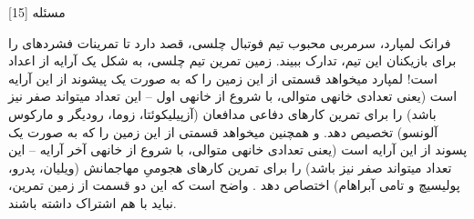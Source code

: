 ‌مسئله [15]


% 
%
%
% 
فرانک لمپارد، سرمربی محبوب تیم فوتبال چلسی، قصد دارد تا تمرینات فشردهای را برای بازیکنان این تیم، تدارک ببیند.
زمین تمرین تیم چلسی، به شکل یک آرایه از اعداد است! لمپارد میخواهد قسمتی از این زمین را که به صورت یک پیشوند از
این آرایه است (یعنی تعدادی خانهی متوالی، با شروع از خانهی اول – این تعداد میتواند صفر نیز باشد) را برای تمرین
کارهای دفاعی مدافعان (آزپیلیکوئتا، زوما، رودیگر و مارکوس آلونسو) تخصیص دهد. و همچنین میخواهد قسمتی از این
زمین را که به صورت یک پسوند از این آرایه است (یعنی تعدادی خانهی متوالی، با شروع از خانهی آخر آرایه – این تعداد میتواند صفر نیز باشد) را برای تمرین کارهای هجومیِ مهاجمانش (ویلیان، پدرو، پولیسیچ و تامی آبراهام) اختصاص دهد .
واضح است که این دو قسمت از زمین تمرین، نباید با هم اشتراک داشته باشند.

